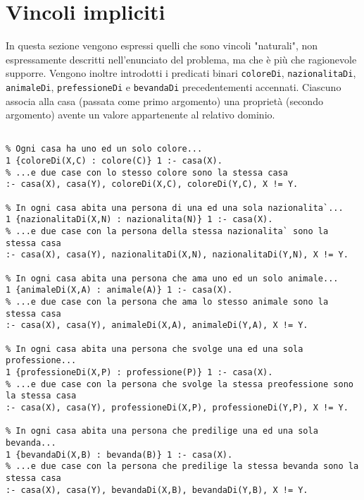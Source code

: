 \section{Vincoli impliciti}
In questa sezione vengono espressi quelli che sono vincoli "naturali", non espressamente descritti nell'enunciato del problema, ma che è più che ragionevole supporre. Vengono inoltre introdotti i predicati binari \texttt{coloreDi}, \texttt{nazionalitaDi}, \texttt{animaleDi}, \texttt{prefessioneDi} e \texttt{bevandaDi} precedentementi accennati. Ciascuno associa alla casa (passata come primo argomento) una proprietà (secondo argomento) avente un valore appartenente al relativo dominio.
\begin{lstlisting}[frame=tb]
%% Vincoli impliciti

% Ogni casa ha uno ed un solo colore...
1 {coloreDi(X,C) : colore(C)} 1 :- casa(X).
% ...e due case con lo stesso colore sono la stessa casa
:- casa(X), casa(Y), coloreDi(X,C), coloreDi(Y,C), X != Y.

% In ogni casa abita una persona di una ed una sola nazionalita`...
1 {nazionalitaDi(X,N) : nazionalita(N)} 1 :- casa(X).
% ...e due case con la persona della stessa nazionalita` sono la stessa casa
:- casa(X), casa(Y), nazionalitaDi(X,N), nazionalitaDi(Y,N), X != Y.

% In ogni casa abita una persona che ama uno ed un solo animale...
1 {animaleDi(X,A) : animale(A)} 1 :- casa(X).
% ...e due case con la persona che ama lo stesso animale sono la stessa casa
:- casa(X), casa(Y), animaleDi(X,A), animaleDi(Y,A), X != Y.

% In ogni casa abita una persona che svolge una ed una sola professione...
1 {professioneDi(X,P) : professione(P)} 1 :- casa(X).
% ...e due case con la persona che svolge la stessa preofessione sono la stessa casa
:- casa(X), casa(Y), professioneDi(X,P), professioneDi(Y,P), X != Y.

% In ogni casa abita una persona che predilige una ed una sola bevanda...
1 {bevandaDi(X,B) : bevanda(B)} 1 :- casa(X).
% ...e due case con la persona che predilige la stessa bevanda sono la stessa casa
:- casa(X), casa(Y), bevandaDi(X,B), bevandaDi(Y,B), X != Y.
\end{lstlisting}
